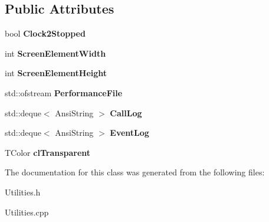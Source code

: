 \subsection*{Public Attributes}
\begin{DoxyCompactItemize}
\item 
\mbox{\label{class_t_utilities_a0fd0d8e0ec95309b508fd37fa541555e}} 
bool {\bfseries Clock2\+Stopped}
\item 
\mbox{\label{class_t_utilities_ac9422864dc36c3d98ad952f10026c572}} 
int {\bfseries Screen\+Element\+Width}
\item 
\mbox{\label{class_t_utilities_a45d9703729a28c2fb2638539fa909e81}} 
int {\bfseries Screen\+Element\+Height}
\item 
\mbox{\label{class_t_utilities_acc7cd1d066ac7942ad6c1239b3c25eee}} 
std\+::ofstream {\bfseries Performance\+File}
\item 
\mbox{\label{class_t_utilities_abf6c3e70d5fbf58720ff0d9f80de5bde}} 
std\+::deque$<$ Ansi\+String $>$ {\bfseries Call\+Log}
\item 
\mbox{\label{class_t_utilities_ace6be5cece5f2e271c0b85a9d2f51917}} 
std\+::deque$<$ Ansi\+String $>$ {\bfseries Event\+Log}
\item 
\mbox{\label{class_t_utilities_a89b8716bbc78332d40427ed688ce56bd}} 
T\+Color {\bfseries cl\+Transparent}
\end{DoxyCompactItemize}


The documentation for this class was generated from the following files\+:\begin{DoxyCompactItemize}
\item 
Utilities.\+h\item 
Utilities.\+cpp\end{DoxyCompactItemize}
